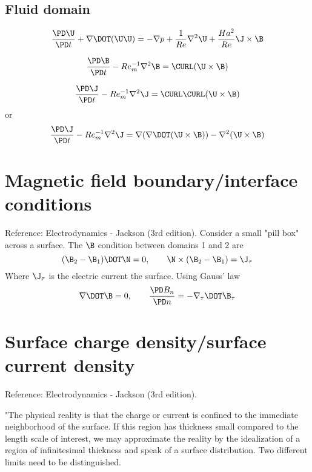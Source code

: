 \documentclass[11pt]{article}
\begin{document}
\subsection{Fluid domain}
\begin{equation}
  \frac{\PD \U}{\PD t} + \nabla \DOT (\U \U)
  = - \nabla p + \frac{1}{Re} \nabla^2 \U
  + \frac{Ha^2}{Re} \J \times \B
\end{equation}

\begin{equation}
  \frac{\PD \B}{\PD t} -
  Re_m^{-1} \nabla^2 \B =
  \CURL (\U \times \B)
\end{equation}

\begin{equation}
  \frac{\PD \J}{\PD t} - Re_m^{-1} \nabla^2 \J = \CURL \CURL (\U \times \B)
\end{equation}
or
\begin{equation}
  \frac{\PD \J}{\PD t} - Re_m^{-1} \nabla^2 \J = \nabla (\nabla \DOT (\U \times \B)) - \nabla^2 (\U \times \B)
\end{equation}

\section{Magnetic field boundary/interface conditions}
Reference: Electrodynamics - Jackson (3rd edition). Consider a small "pill box" across a surface. The $\B$ condition between domains 1 and 2 are
\begin{equation}
  (\B_2 - \B_1)\DOT \N = 0
  , \qquad
  \N \times (\B_2 - \B_1) = \J_{\tau}
\end{equation}
Where $\J_{\tau}$ is the electric current the surface. Using Gauss' law
\begin{equation}
    \nabla \DOT \B = 0
    , \qquad
    \frac{\PD B_n}{\PD n} = - \nabla_{\tau} \DOT \B_{\tau}
\end{equation}

\section{Surface charge density/surface current density}
Reference: Electrodynamics - Jackson (3rd edition).

"The physical reality is that the charge or current is confined to the immediate neighborhood of the surface. If this region has thickness small compared to the length scale of interest, we may approximate the reality by the idealization of a region of infinitesimal thickness and speak of a surface distribution. Two different limits need to be distinguished.
\end{document}
